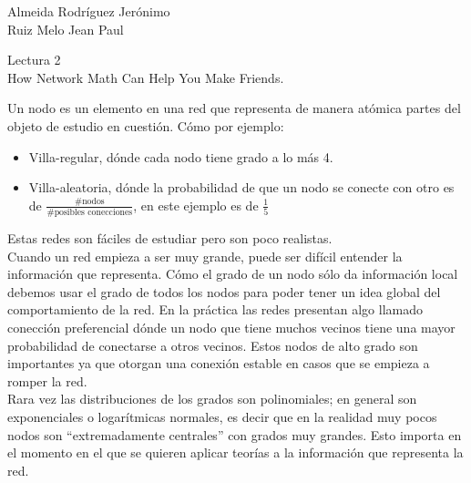 \documentclass[a4paper, 12pt]{report}
\begin{document}
\begin{flushright}
    Almeida Rodríguez Jerónimo\\
    Ruiz Melo Jean Paul
\end{flushright}

\begin{center}
    {\LARGE Lectura 2}\\
    {\LARGE How Network Math Can Help You Make Friends.}
\end{center}

Un nodo es un elemento en una red que representa de manera atómica partes del
objeto de estudio en cuestión. Cómo por ejemplo:
\begin{itemize}
    \item Villa-regular, dónde cada nodo tiene grado a lo más 4.
    \item Villa-aleatoria, dónde la probabilidad de que un nodo se conecte con
        otro es de $\frac{\#\text{nodos}}{\#\text{posibles conecciones}}$, en este
        ejemplo es de $\frac{1}{5}$
\end{itemize}

Estas redes son fáciles de estudiar pero son poco realistas.\\

Cuando un red empieza a ser muy grande, puede ser difícil entender la
información que representa. Cómo el grado de un nodo sólo da información local
debemos usar el grado de todos los nodos para poder tener un idea global del
comportamiento de la red. En la práctica las redes presentan algo llamado
conección preferencial dónde un nodo que tiene muchos vecinos tiene  una mayor
probabilidad de conectarse a otros vecinos. Estos nodos de alto grado son
importantes ya que otorgan una conexión estable en casos que se empieza a romper
la red.\\

Rara vez las distribuciones de los grados son polinomiales; en general son
exponenciales o logarítmicas normales, es decir que en la realidad muy pocos
nodos son ``extremadamente centrales'' con grados muy grandes. Esto importa en
el momento en el que se quieren aplicar teorías a la información que representa la red.
\end{document}
